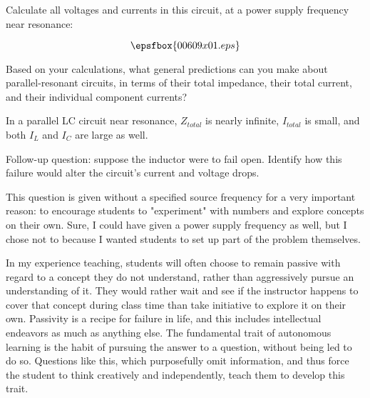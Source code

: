 

Calculate all voltages and currents in this circuit, at a power supply frequency near resonance:

$$\epsfbox{00609x01.eps}$$

Based on your calculations, what general predictions can you make about parallel-resonant circuits, in terms of their total impedance, their total current, and their individual component currents?







In a parallel LC circuit near resonance, $Z_{total}$ is nearly infinite, $I_{total}$ is small, and both $I_L$ and $I_C$ are large as well.  

\vskip 10pt

Follow-up question: suppose the inductor were to fail open.  Identify how this failure would alter the circuit's current and voltage drops.







This question is given without a specified source frequency for a very important reason: to encourage students to "experiment" with numbers and explore concepts on their own.  Sure, I could have given a power supply frequency as well, but I chose not to because I wanted students to set up part of the problem themselves.

In my experience teaching, students will often choose to remain passive with regard to a concept they do not understand, rather than aggressively pursue an understanding of it.  They would rather wait and see if the instructor happens to cover that concept during class time than take initiative to explore it on their own.  Passivity is a recipe for failure in life, and this includes intellectual endeavors as much as anything else.  The fundamental trait of autonomous learning is the habit of pursuing the answer to a question, without being led to do so.  Questions like this, which purposefully omit information, and thus force the student to think creatively and independently, teach them to develop this trait.




